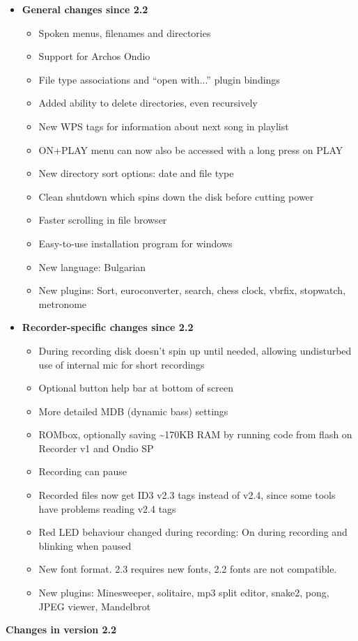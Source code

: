 \begin{itemize}
\item {\bfseries
General changes since 2.2}

\begin{itemize}
\item Spoken menus, filenames and directories
\item Support for Archos Ondio
\item File type associations and ``open with...'' plugin bindings
\item Added ability to delete directories, even recursively
\item New WPS tags for information about next song in playlist
\item ON+PLAY menu can now also be accessed with a long press on PLAY
\item New directory sort options: date and file type
\item Clean shutdown which spins down the disk before cutting power
\item Faster scrolling in file browser
\item Easy{}-to{}-use installation program for windows
\item New language: Bulgarian
\item New plugins: Sort, euroconverter, search, chess clock, vbrfix,
stopwatch, metronome
\end{itemize}
\item {\bfseries
Recorder{}-specific changes since 2.2}

\begin{itemize}
\item During recording disk doesn't spin up until
needed, allowing undisturbed use of internal mic for short recordings
\item Optional button help bar at bottom of screen
\item More detailed MDB (dynamic bass) settings
\item ROMbox, optionally saving \~{}170KB RAM by running code from flash
on Recorder v1 and Ondio SP
\item Recording can pause
\item Recorded files now get ID3 v2.3 tags instead of v2.4, since some
tools have problems reading v2.4 tags
\item Red LED behaviour changed during recording: On during recording
and blinking when paused
\item New font format. 2.3 requires new fonts, 2.2 fonts are not
compatible.
\item New plugins: Minesweeper, solitaire, mp3 split editor, snake2,
pong, JPEG viewer, Mandelbrot
\end{itemize}
\end{itemize}
{\bfseries
Changes in version 2.2}

